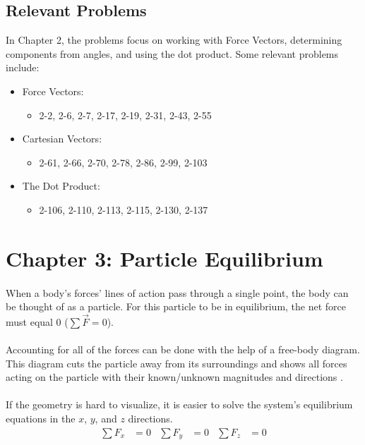 \documentclass[12pt]{article}
\begin{document}
\subsection{Relevant Problems}
In Chapter 2, the problems focus on working with Force Vectors, determining components from angles, and using the dot product.
Some relevant problems include:
\begin{itemize}
    \item Force Vectors:
    \begin{itemize}
        \item 2-2, 2-6, 2-7, 2-17, 2-19, 2-31, 2-43, 2-55
    \end{itemize}
    \item Cartesian Vectors:
    \begin{itemize}
        \item 2-61, 2-66, 2-70, 2-78, 2-86, 2-99, 2-103
    \end{itemize}
    \item The Dot Product:
    \begin{itemize}
        \item 2-106, 2-110, 2-113, 2-115, 2-130, 2-137
    \end{itemize}
\end{itemize}
\pagebreak

\section{Chapter 3: Particle Equilibrium}
\paragraph{}
When a body's forces' lines of action pass through a single point, the body can be thought of as a particle. 
For this particle to be in equilibrium, the net force must equal 0 ($\sum{\vec{F}} = 0$).

\paragraph{}
Accounting for all of the forces can be done with the help of a free-body diagram.
This diagram cuts the particle away from its surroundings and shows all forces acting on the particle with their known/unknown magnitudes and directions \cite{buckham}.

\paragraph{}
If the geometry is hard to visualize, it is easier to solve the system's equilibrium equations in the $x$, $y$, and $z$ directions.
\begin{align*}
    \sum{F_x} &= 0 & \sum{F_y} &= 0 & \sum{F_z} &= 0
\end{align*}
\end{document}

